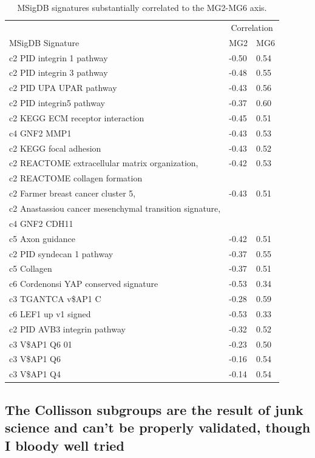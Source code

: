 \documentclass[dissertation.tex]{subfiles}
\begin{document}
\begin{table}[ht]
\caption{\acrshort{MSigDB} signatures substantially correlated to the MG2-MG6 axis.\label{tab:sigs-msigdb-corrs-mg26}}
\centering
\begin{tabularx}{\textwidth}{ @{} X l l @{} }
  \toprule
   & \multicolumn{2}{c}{Correlation} \\
  MSigDB Signature & MG2 & MG6 \\ 
  \midrule
  c2 PID integrin 1 pathway & -0.50 & 0.54 \\ 
  c2 PID integrin 3 pathway & -0.48 & 0.55 \\ 
  c2 PID UPA UPAR pathway & -0.43 & 0.56 \\ 
  c2 PID integrin5 pathway & -0.37 & 0.60 \\ 
  c2 KEGG ECM receptor interaction & -0.45 & 0.51 \\ 
  c4 GNF2 MMP1 & -0.43 & 0.53 \\ 
  c2 KEGG focal adhesion & -0.43 & 0.52 \\ 
  c2 REACTOME extracellular matrix organization, & -0.42 & 0.53 \\ 
  c2 REACTOME collagen formation & & \\
  c2 Farmer breast cancer cluster 5, & -0.43 & 0.51 \\ 
  c2 Anastassiou cancer mesenchymal transition signature, & & \\
  c4 GNF2 CDH11 & & \\
  c5 Axon guidance & -0.42 & 0.51 \\ 
  c2 PID syndecan 1 pathway & -0.37 & 0.55 \\ 
  c5 Collagen & -0.37 & 0.51 \\ 
  c6 Cordenonsi YAP conserved signature & -0.53 & 0.34 \\ 
  c3 TGANTCA v\$AP1 C & -0.28 & 0.59 \\ 
  c6 LEF1 up v1 signed & -0.53 & 0.33 \\ 
  c2 PID AVB3 integrin pathway & -0.32 & 0.52 \\ 
  c3 V\$AP1 Q6 01 & -0.23 & 0.50 \\ 
  c3 V\$AP1 Q6 & -0.16 & 0.54 \\ 
  c3 V\$AP1 Q4 & -0.14 & 0.54 \\ 
   \bottomrule
\end{tabularx}
\end{table}

\subsection{The Collisson subgroups are the result of junk science and can't be properly validated, though I bloody well tried}
\end{document}

